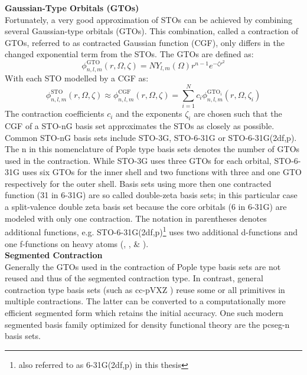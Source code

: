 \textbf{Gaussian-Type Orbitals (GTOs)}\\
Fortunately, a very good approximation of STOs can be achieved by combining several Gaussian-type orbitals (GTOs). This combination, called a contraction of GTOs, referred to as contracted Gaussian function (CGF), only differs in the changed exponential term from the STOs. The GTOs are defined as:
\begin{equation}
    \label{eq:gaussian_orbital}
    \phi_{n, l, m}^{\text{GTO}}(r, \Omega, \zeta) = N Y_{l,m}(\Omega) r^{n-1} e^{-\zeta r^2}
\end{equation}
With each STO modelled by a CGF as: 
\begin{equation}
    \phi_{n, l, m}^{\text{STO}}(r, \Omega, \zeta)  \approx \phi_{n, l, m}^{\text{CGF}}(r, \Omega, \zeta) = \sum_{i=1}^N c_i \phi_{n, l, m}^{\text{GTO}_i}(r, \Omega, \zeta_i)
\end{equation}
The contraction coefficients $c_i$ and the exponents $\zeta_i$ are chosen such that the CGF of a STO-nG basis set approximates the STOs as closely as possible. Common STO-nG basis sets include STO-3G, STO-6-31G or STO-6-31G(2df,p). \\
The n in this nomenclature of Pople type basis sets \parencite{ref:pople_basis} denotes the number of GTOs used in the contraction. While STO-3G uses three GTOs for each orbital, STO-6-31G uses six GTOs for the inner shell and two functions with three and one GTO respectively for the outer shell. Basis sets using more then one contracted function (31 in 6-31G) are so called double-zeta basis sets; in this particular case a split-valence double zeta basis set because the core orbitals (6 in 6-31G) are modeled with only one contraction. The notation in parentheses denotes additional functions, e.g. STO-6-31G(2df,p)\footnote{also referred to as 6-31G(2df,p) in this thesis} uses two additional d-functions and one f-functions on heavy atoms (, ,  \& ). \\

\textbf{Segmented Contraction}\\
Generally the GTOs used in the contraction of Pople type basis sets are not reused and thus of the segmented contraction type. In contrast, general contraction type basis sets (such as cc-pVXZ \parencite{ref:cc-pVXZ}) reuse some or all primitives in multiple contractions. The latter can be converted to a computationally more efficient segmented form which retains the initial accuracy. One such modern segmented basis family optimized for density functional theory are the pcseg-n basis sets. \parencite{ref:Jensen2014pcs}\\

